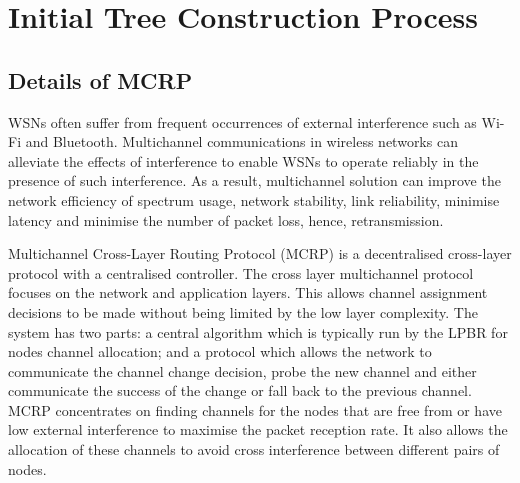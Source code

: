 \section{Initial Tree Construction Process}
\label{MCRP}
\subsection{Details of MCRP}

WSNs often suffer from frequent occurrences of external interference such as Wi-Fi and Bluetooth.
Multichannel communications in wireless networks can alleviate the effects of interference to enable WSNs to operate reliably in the presence of such interference. As a result, multichannel solution can improve the network efficiency of spectrum usage, network stability, link reliability, minimise latency and minimise the number of packet loss, hence, retransmission.

Multichannel Cross-Layer Routing Protocol (MCRP) \cite{mcrp} is a decentralised cross-layer protocol with a centralised controller. The cross layer multichannel protocol focuses on the network and application layers. This allows channel assignment decisions to be made without being limited by the low layer complexity. The system has two parts: a central algorithm which is typically run by the LPBR for nodes channel allocation; and a protocol which allows the network to communicate the channel change decision, probe the new channel and either communicate the success of the change or fall back to the previous channel. MCRP concentrates on finding channels for the nodes that are free from or have low external interference to maximise the packet reception rate. It also allows the allocation of these channels to avoid cross interference between different pairs of nodes.




